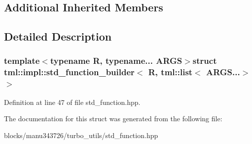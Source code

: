 \subsection*{Additional Inherited Members}


\subsection{Detailed Description}
\subsubsection*{template$<$typename R, typename... A\+R\+G\+S$>$struct tml\+::impl\+::std\+\_\+function\+\_\+builder$<$ R, tml\+::list$<$ A\+R\+G\+S...$>$ $>$}



Definition at line 47 of file std\+\_\+function.\+hpp.



The documentation for this struct was generated from the following file\+:\begin{DoxyCompactItemize}
\item 
blocks/manu343726/turbo\+\_\+utils/std\+\_\+function.\+hpp\end{DoxyCompactItemize}
